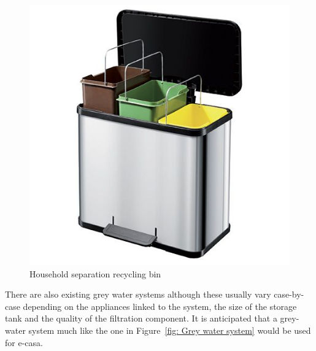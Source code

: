 \documentclass[a4paper,11pt,fleqn]{report}
\begin{document}
\begin{figure}[h!]
\begin{center}
\includegraphics[scale = 0.34]{HouseholdRecyclingBin.jpg}
\caption{Household separation recycling bin}
\label{fig: Household separation recycling bin}
\end{center}
\end{figure}

There are also existing grey water systems although these usually vary case-by-case depending on the appliances linked to the system, the size of the storage tank and the quality of the filtration component. It is anticipated that a grey-water system much like the one in Figure~\ref{fig: Grey water system} would be used for \ac{e-casa}.
\end{document}
